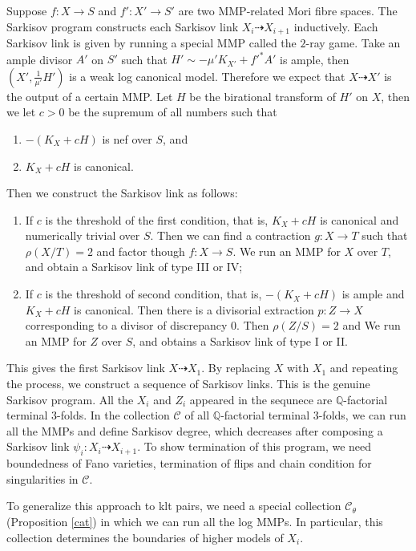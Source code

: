 \documentclass[11pt]{amsart}
\begin{document}
Suppose $f:X\to S$ and $f':X'\to S'$ are two MMP-related Mori fibre spaces.
The Sarkisov program constructs each Sarkisov link $X_{i}\dashrightarrow X_{i+1}$ inductively. Each Sarkisov link is given by running a special MMP called the $2$-ray game. Take an ample divisor $A'$ on $S'$ such that $H'\sim -\mu'K_{X'}+f'^*A'$  is ample, then $(X',\frac{1}{\mu'}H')$ is a weak log canonical model.  Therefore we expect that $X\dashrightarrow X'$ is the output of a certain MMP. 
Let $H$ be the birational transform of $H'$ on $X$, then we let $c>0$ be the supremum of all numbers such that 
\begin{enumerate}
  \item $-(K_{X}+cH)$ is nef over $S$, and 
  \item $K_{X}+cH$ is  canonical.
\end{enumerate}
Then we construct the Sarkisov link as follows:
\begin{enumerate}
  \item If $c$ is the threshold of the first condition, that is, $K_{X}+cH$ is canonical and numerically trivial over $S$. Then we can find a contraction $g:X \to T$ such that $\rho(X/T)=2$ and factor though $f:X \to S$.  We run an MMP for  $X$ over $T$, and obtain a Sarkisov link of type III or IV;
  \item If $c$ is the threshold of second condition, that is, $-(K_{X}+cH)$ is ample and $K_{X}+cH$ is canonical. Then there is a divisorial extraction $p:Z\to X$ corresponding to a divisor of discrepancy $0$. Then  $\rho(Z/S)=2$ and  We run an MMP for $Z$ over $S$, and obtains a Sarkisov link of type I or II. 
\end{enumerate}
This gives the first Sarkisov link $X \dashrightarrow  X_{1}$. By replacing $X$ with $X_{1}$ and repeating the process, we construct a sequence of Sarkisov links. This is the genuine Sarkisov program. All the $X_{i}$ and $Z_{i}$ appeared in the sequnece are $\mathbb{Q}$-factorial terminal 3-folds.
In the collection $\mathcal{C}$ of all $\mathbb{Q}$-factorial terminal 3-folds, we can run all the MMPs and define Sarkisov degree, which decreases after composing a Sarkisov link $\psi_{i}:X_{i}\dashrightarrow X_{i+1}$.
To show termination of this program, we need boundedness of Fano varieties, termination of flips and chain condition for singularities in $\mathcal{C}$. 

To generalize this approach to klt pairs, we need a  special collection $\mathcal{C}_{\theta}$ (Proposition \ref{cat}) in which we can run all the log MMPs. In particular, this collection determines the boundaries of higher models of $X_{i}$. 
\end{document}
